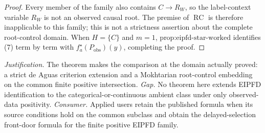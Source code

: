 \documentclass{article}
\begin{document}
\begin{proof}
Every member of the family also contains \(C\to R_W\), so the label-context variable \(R_W\) is not an observed causal root.  The premise of \(\operatorname{RC}\) is therefore inapplicable to this family; this is not a strictness assertion about the complete root-control domain.  When \(H=\{C\}\) and \(m=1\), \(\text{prop:eipfd-star-worked}\) identifies (7) term by term with \(f_a^\star(P_{\mathrm{obs}})(y)\), completing the proof.
\end{proof}
\par\smallskip\noindent \textit{Justification.} The theorem makes the comparison at the domain actually proved: a strict de Aguas criterion extension and a Mokhtarian root-control embedding on the common finite positive intersection. \textit{Gap.} No theorem here extends EIPFD identification to the categorical-or-continuous ambient class under only observed-data positivity. \textit{Consumer.} Applied users retain the published formula when its source conditions hold on the common subclass and obtain the delayed-selection front-door formula for the finite positive EIPFD family.
\end{document}
